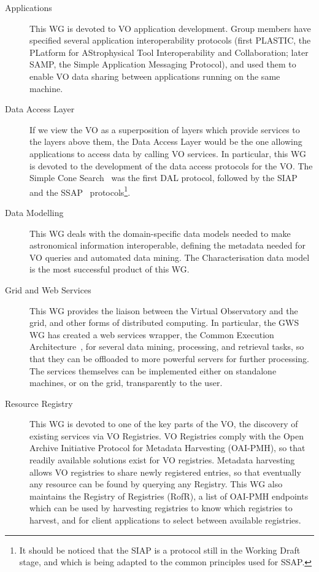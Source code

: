 		\begin{description}
			\item[Applications] This WG is devoted to VO
			application development. Group members have specified
			several application interoperability protocols (first
			PLASTIC, the PLatform for AStrophysical Tool
			Interoperability and Collaboration; later SAMP, the
			Simple Application Messaging Protocol), and used them
			to enable VO data sharing between applications running
			on the same machine.
			
			 \item[Data Access Layer] If we view the VO as a
			superposition of layers which provide services to the
			layers above them, the Data Access Layer would be the
			one allowing applications to access data by calling VO
			services. In particular, this WG is devoted to the
			development of the data access protocols for the VO.
			The Simple Cone Search~\cite{Williams:2008fv} was the
			first DAL protocol, followed by the
			SIAP~\cite{2008sia..rprt.....T} and the
			SSAP~\cite{Tody:2007yq} protocols\footnote{It should
			be noticed that the SIAP is a protocol still in the
			Working Draft stage, and which is being adapted to
			the common principles used for SSAP.}.
			
			 \item[Data Modelling] This WG deals with the
			domain-specific data models needed to make astronomical
			information interoperable, defining the metadata needed
			for VO queries and automated data mining. The
			Characterisation data model~\cite{McDowell:2007ly} is
			the most successful product of this WG.
			
			 \item[Grid and Web Services] This WG provides the
			liaison between the Virtual Observatory and the grid,
			and other forms of distributed computing. In
			particular, the GWS WG has created a web services
			wrapper, the Common Execution
			Architecture~\cite{Harrison:2005la}, for several data
			mining, processing, and retrieval tasks, so that they
			can be offloaded to more powerful servers for further
			processing. The services themselves can be implemented
			either on standalone machines, or on the grid,
			transparently to the user.
			
			 \item[Resource Registry] This WG is devoted to one of
			the key parts of the VO, the discovery of existing
			services via VO Registries. VO Registries comply with
			the Open Archive Initiative Protocol for Metadata
			Harvesting (OAI-PMH), so that readily available
			solutions exist for VO registries. Metadata harvesting
			allows VO registries to share newly registered entries,
			so that eventually any resource can be found by
			querying any Registry. This WG also maintains the
			Registry of Registries (RofR), a list of OAI-PMH
			endpoints which can be used by harvesting registries
			to know which registries to harvest, and for client
			applications to select between available registries.
			

\end{description}
